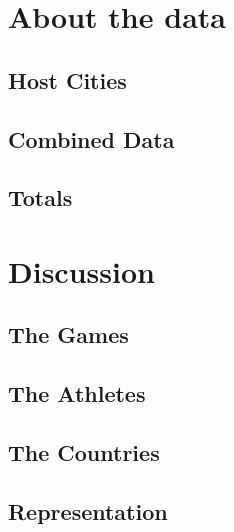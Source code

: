 \documentclass[a4 paper, 12pt]{article}
\begin{document}
\pagebreak
\appendix
\appendixpage
\addappheadtotoc
\section{About the data}

    \subsection{Host Cities}
    

    \pagebreak
    \subsection{Combined Data}
    

    \pagebreak
    \subsection{Totals}
    


\pagebreak
\section{Discussion}
    \subsection{The Games}
    

    \pagebreak
    \subsection{The Athletes}
    

    \pagebreak
    \subsection{The Countries}
    

    \pagebreak
    \subsection{Representation}
    
\end{document}
